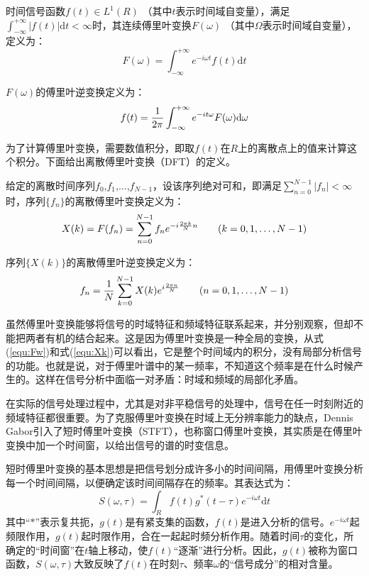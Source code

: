 时间信号函数$ f(t) \in L^1(R) $ （其中$ t $表示时间域自变量），满足$ \int_{-\infty}^{+\infty}\left|f(t)\right|\mathrm{d}t < \infty $时，其连续傅里叶变换$ F(\omega) $ （其中$ \Omega $表示时间域自变量），定义为：
\begin{equation}
\label{equ:Fw}
	F(\omega) = \int_{-\infty}^{+\infty} e^{-i\omega t}f(t)\mathrm{d}t
\end{equation}

$ F(\omega) $的傅里叶逆变换定义为：
\begin{equation}
	f(t) = {1\over2\pi} \int_{-\infty}^{+\infty} e^{-it\omega}F(\omega)\mathrm{d}\omega
\end{equation}

为了计算傅里叶变换，需要数值积分，即取$ f(t) $在$ R $上的离散点上的值来计算这个积分。下面给出离散傅里叶变换（DFT）的定义。

给定的离散时间序列$f_0$,$f_1$,$\ldots$,$f_{N-1}$，设该序列绝对可和，即满足$ \sum_{n=0}^{N-1} \left|f_n\right| < \infty $时，序列$ \{ f_n \} $的离散傅里叶变换定义为：
\begin{equation}
\label{equ:Xk}
	X(k) = F(f_n) = \sum_{n=0}^{N-1} f_n e^{-i {2\pi k\over N} n}\qquad
	(k=0,1,\ldots,N-1)
\end{equation}

序列$ \{ X(k) \} $的离散傅里叶逆变换定义为：
\begin{equation}
	f_n = {1\over N} \sum_{k=0}^{N-1} X(k) e^{i {2\pi n\over N}}\qquad
	(n=0,1,\ldots,N-1)
\end{equation}

虽然傅里叶变换能够将信号的时域特征和频域特征联系起来，并分别观察，但却不能把两者有机的结合起来。这是因为傅里叶变换是一种全局的变换，从式(\ref{equ:Fw})和式(\ref{equ:Xk})可以看出，它是整个时间域内的积分，没有局部分析信号的功能。也就是说，对于傅里叶谱中的某一频率，不知道这个频率是在什么时候产生的。这样在信号分析中面临一对矛盾：时域和频域的局部化矛盾。

在实际的信号处理过程中，尤其是对非平稳信号的处理中，信号在任一时刻附近的频域特征都很重要。为了克服傅里叶变换在时域上无分辨率能力的缺点，Dennis Gabor引入了短时傅里叶变换（STFT），也称窗口傅里叶变换，其实质是在傅里叶变换中加一个时间窗，以给出信号的谱的时变信息。

短时傅里叶变换的基本思想是把信号划分成许多小的时间间隔，用傅里叶变换分析每一个时间间隔，以便确定该时间间隔存在的频率。其表达式为：
\begin{equation}
	S(\omega,\tau) = \int_{R} f(t) g^{*}(t-\tau) e^{-i\omega t} \mathrm{d}t
\end{equation}
其中“$*$”表示复共扼，$g(t)$是有紧支集的函数，$f(t)$是进入分析的信号。$e^{-i\omega t}$起频限作用，$g(t)$起时限作用，合在一起起时频分析作用。随着时间$\tau$的变化，所确定的“时间窗”在$t$轴上移动，使$f(t)$“逐渐”进行分析。因此，$g(t)$被称为窗口函数，$S(\omega,\tau)$大致反映了$f(t)$在时刻$\tau$、频率$\omega$的“信号成分”的相对含量。

